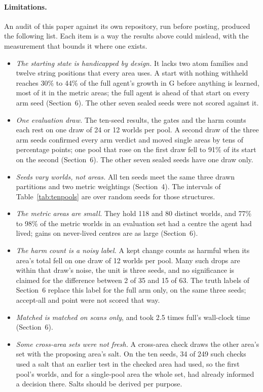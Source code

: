 \documentclass[11pt]{article}
\begin{document}
\paragraph{Limitations.} An audit of this paper against its own repository, run before posting, produced the following list. Each item is a way the results above could mislead, with the measurement that bounds it where one exists.
\begin{itemize}[leftmargin=*]
\item \emph{The starting state is handicapped by design.} It lacks two atom families and twelve string positions that every area uses. A start with nothing withheld reaches 30\% to 44\% of the full agent's growth in G before anything is learned, most of it in the metric areas; the full agent is ahead of that start on every arm seed (Section~6). The other seven sealed seeds were not scored against it.
\item \emph{One evaluation draw.} The ten-seed results, the gates and the harm counts each rest on one draw of 24 or 12 worlds per pool. A second draw of the three arm seeds confirmed every arm verdict and moved single areas by tens of percentage points; one pool that rose on the first draw fell to 91\% of its start on the second (Section~6). The other seven sealed seeds have one draw only.
\item \emph{Seeds vary worlds, not areas.} All ten seeds meet the same three drawn partitions and two metric weightings (Section~4). The intervals of Table~\ref{tab:tenpools} are over random seeds for those structures.
\item \emph{The metric areas are small.} They hold 118 and 80 distinct worlds, and 77\% to 98\% of the metric worlds in an evaluation set had a centre the agent had lived; gains on never-lived centres are as large (Section~6).
\item \emph{The harm count is a noisy label.} A kept change counts as harmful when its area's total fell on one draw of 12 worlds per pool. Many such drops are within that draw's noise, the unit is three seeds, and no significance is claimed for the difference between 2 of 35 and 15 of 63. The truth labels of Section~6 replace this label for the full arm only, on the same three seeds; accept-all and point were not scored that way.
\item \emph{Matched is matched on scans only}, and took 2.5 times full's wall-clock time (Section~6).
\item \emph{Some cross-area sets were not fresh.} A cross-area check draws the other area's set with the proposing area's salt. On the ten seeds, 34 of 249 such checks used a salt that an earlier test in the checked area had used, so the first pool's worlds, and for a single-pool area the whole set, had already informed a decision there. Salts should be derived per purpose.

\end{itemize}
\end{document}
